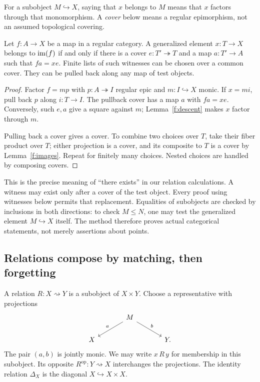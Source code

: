 For a subobject $M\hookrightarrow X$, saying that $x$ belongs to $M$
means that $x$ factors through that monomorphism. A \emph{cover} below
means a regular epimorphism, not an assumed topological covering.

\begin{lemma}\label{f:local-calculus}
Let $f:A\to X$ be a map in a regular category. A generalized element
$x:T\to X$ belongs to $\operatorname{im}(f)$ if and only if there is a cover
$e:T'\twoheadrightarrow T$ and a map $a:T'\to A$ such that $fa=xe$.
Finite lists of such witnesses can be chosen over a common cover.
They can be pulled back along any map of test objects.
\end{lemma}
\begin{proof}
Factor $f=mp$ with $p:A\twoheadrightarrow I$ regular epic and $m:I\hookrightarrow X$
monic. If $x=mi$, pull back $p$ along $i:T\to I$. The pullback cover
has a map $a$ with $fa=xe$. Conversely, such $e,a$ give a square
against $m$; Lemma~\ref{f:descent} makes $x$ factor through $m$.

Pulling back a cover gives a cover. To combine two choices over $T$,
take their fiber product over $T$; either projection is a cover, and
its composite to $T$ is a cover by Lemma~\ref{f:images}. Repeat for
finitely many choices. Nested choices are handled by composing covers.
\end{proof}

This is the precise meaning of ``there exists'' in our relation
calculations. A witness may exist only after a cover of the test object.
Every proof using witnesses below permits that replacement. Equalities
of subobjects are checked by inclusions in both directions: to check
$M\leq N$, one may test the generalized element $M\hookrightarrow X$
itself. The method therefore proves actual categorical statements,
not merely assertions about points.

\subsection{Relations compose by matching, then forgetting}

\begin{definition}
A relation $R:X\rightsquigarrow Y$ is a subobject of $X\times Y$.
Choose a representative with projections
\[
\begin{tikzcd}[column sep=large]
& M \arrow[dl,"a"'] \arrow[dr,"b"] &\\
X && Y.
\end{tikzcd}
\]
The pair $(a,b)$ is jointly monic. We may write $x\,R\,y$ for membership
in this subobject. Its opposite $R^{\mathrm{op}}:Y\rightsquigarrow X$
interchanges the projections. The identity relation $\Delta_X$ is the
diagonal $X\hookrightarrow X\times X$.
\end{definition}

